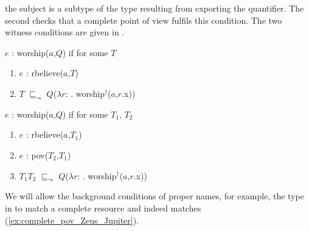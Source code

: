 the subject is a subtype of the type resulting from exporting the
quantifier.  The second checks that a complete point of view fulfils
this condition.  The two witness conditions are given in \nexteg{}.
\begin{ex} 
\begin{subex} 
 
\item $e$ : worship($a$,$Q$) if for some $T$
\begin{enumerate} 
 
\item $e$ : rbelieve($a$,$T$) 
 
\item $T$ $\sqsubseteq_{\leadsto}$ $Q$($\lambda
  r$: . worship$^\dagger$($a$,$r$.x))
 
\end{enumerate} 
 
 
\item $e$ : worship($a$,$Q$) if for some $T_1$, $T_2$
\begin{enumerate} 
 
\item $e$ : rbelieve($a$,$T_1$)

\item $e$ : pov($T_2$,$T_1$) 
 
\item $T_1$\fbox{\d{$\wedge$}}$T_2$ $\sqsubseteq_{\leadsto}$ $Q$($\lambda
  r$:
  . worship$^\dagger$($a$,$r$.x)) 

\end{enumerate}
 
\end{subex}
\label{ex:witness_cond_worship_pov} 
   
\end{ex} 
  
  

We will allow the background conditions of proper names, for example,
the type in \nexteg{} to match a complete resource and indeed
\nexteg{} matches (\ref{ex:complete_pov_Zeus_Jupiter}).
\begin{ex} 
 

   
\end{ex} 
 

